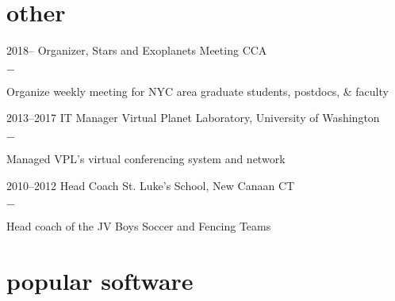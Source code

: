 \documentclass[]{luger-cv} %
\begin{document}
\section{other}
\begin{entrylist}


    \entry
    {2018--}
    {Organizer, Stars and Exoplanets Meeting}
    {CCA}
    {%
        \vspace{-1em}
        \begin{list}{{\color{numcolor}$-$}}{\cvlist}
            \item Organize weekly meeting for NYC area graduate students, postdocs, \& faculty
        \end{list}
    }


    \entry
    {2013--2017}
    {IT Manager}
    {Virtual Planet Laboratory, University of Washington}
    {%
        \vspace{-1em}
        \begin{list}{{\color{numcolor}$-$}}{\cvlist}
            \item Managed VPL's virtual conferencing system and network
        \end{list}
    }


    \entry
    {2010--2012}
    {Head Coach}
    {St. Luke's School, New Canaan CT}
    {%
        \vspace{-1em}
        \begin{list}{{\color{numcolor}$-$}}{\cvlist}
            \item Head coach of the JV Boys Soccer and Fencing Teams
        \end{list}
    }


\end{entrylist}

\section{popular software}
\end{document}
